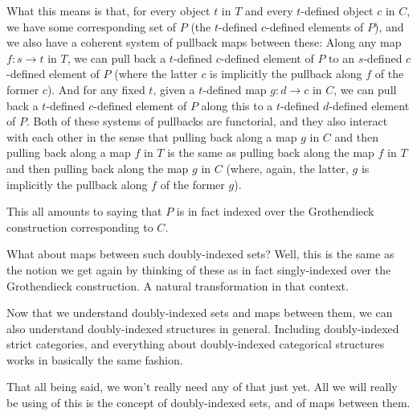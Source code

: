 What this means is that, for every object $t$ in $T$ and every $t$-defined object $c$ in $C$, we have some corresponding set of $P$ (the $t$-defined $c$-defined elements of $P$), and we also have a coherent system of pullback maps between these: Along any map $f : s \to t$ in $T$, we can pull back a $t$-defined $c$-defined element of $P$ to an $s$-defined $c$-defined element of $P$ (where the latter $c$ is implicitly the pullback along $f$ of the former $c$). And for any fixed $t$, given a $t$-defined map $g : d \to c$ in $C$, we can pull back a $t$-defined $c$-defined element of $P$ along this to a $t$-defined $d$-defined element of $P$. Both of these systems of pullbacks are functorial, and they also interact with each other  in the sense that pulling back along a map $g$ in $C$ and then pulling back along a map $f$ in $T$ is the same as pulling back along the map $f$ in $T$ and then pulling back along the map $g$ in $C$ (where, again, the latter, $g$ is implicitly the pullback along $f$ of the former $g$).

This all amounts to saying that $P$ is in fact indexed over the Grothendieck construction corresponding to $C$.

What about maps between such doubly-indexed sets? Well, this is the same as the notion we get again by thinking of these as in fact singly-indexed over the Grothendieck construction. A natural transformation in that context.

Now that we understand doubly-indexed sets and maps between them, we can also understand doubly-indexed structures in general. Including doubly-indexed strict categories, and everything about doubly-indexed categorical structures works in basically the same fashion.

That all being said, we won't really need any of that just yet. All we will really be using of this is the concept of doubly-indexed sets, and of maps between them.
